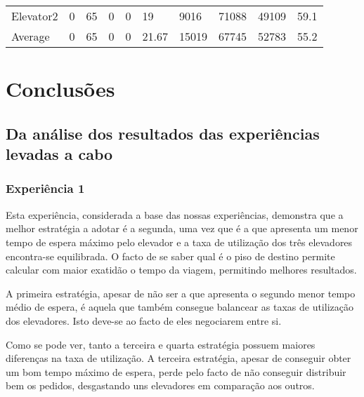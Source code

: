 ﻿\documentclass[a4paper]{article}
\begin{document}
\begin{table}[h]
\begin{tabular}{@{}llllllllll@{}}
Elevator2 & 0        & 65            & 0           & 0                                                               & 19                                                                  & 9016                                                         & 71088                                                 & 49109                                                   & 59.1         \\
Average   & 0     & 65         & 0        & 0                                                               & 21.67                                                               & 15019                                                         & 67745                                                 &  52783                                                  &  55.2        \\ \bottomrule
\end{tabular}
\end{table}

\newpage

\section{Conclusões}

\subsection{Da análise dos resultados das experiências levadas a cabo} 

\subsubsection{Experiência 1}

Esta experiência, considerada a base das nossas experiências, demonstra que a melhor estratégia a adotar é a segunda, uma vez que é a que apresenta um menor tempo de espera máximo pelo elevador e a taxa de utilização dos três elevadores encontra-se equilibrada. O facto de se saber qual é o piso de destino permite calcular com maior exatidão o tempo da viagem, permitindo melhores resultados.

A primeira estratégia, apesar de não ser a que apresenta o segundo menor tempo médio de espera, é aquela que também consegue balancear as taxas de utilização dos elevadores. Isto deve-se ao facto de eles negociarem entre si.

Como se pode ver, tanto a terceira e quarta estratégia possuem maiores diferenças na taxa de utilização. A terceira estratégia, apesar de conseguir obter um bom tempo máximo de espera, perde pelo facto de não conseguir distribuir bem os pedidos, desgastando uns elevadores em comparação aos outros.
\end{document}
